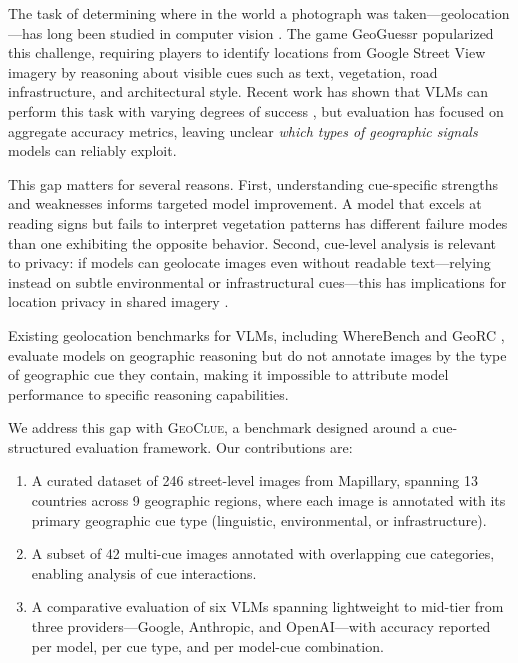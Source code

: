 \documentclass[twoside,11pt]{article}
\newcommand{\benchmark}{\textsc{GeoClue}}
\begin{document}
The task of determining where in the world a photograph was taken---geolocation---has long been studied in computer vision \citep{hays2008im2gps}. The game GeoGuessr popularized this challenge, requiring players to identify locations from Google Street View imagery by reasoning about visible cues such as text, vegetation, road infrastructure, and architectural style. Recent work has shown that VLMs can perform this task with varying degrees of success \citep{haas2024pigeon, jay2025precise}, but evaluation has focused on aggregate accuracy metrics, leaving unclear \emph{which types of geographic signals} models can reliably exploit.

This gap matters for several reasons. First, understanding cue-specific strengths and weaknesses informs targeted model improvement. A model that excels at reading signs but fails to interpret vegetation patterns has different failure modes than one exhibiting the opposite behavior. Second, cue-level analysis is relevant to privacy: if models can geolocate images even without readable text---relying instead on subtle environmental or infrastructural cues---this has implications for location privacy in shared imagery \citep{mendes2024gptgeochat}.

Existing geolocation benchmarks for VLMs, including WhereBench \citep{wherebench2025} and GeoRC \citep{talreja2026georc}, evaluate models on geographic reasoning but do not annotate images by the type of geographic cue they contain, making it impossible to attribute model performance to specific reasoning capabilities.

We address this gap with \benchmark{}, a benchmark designed around a cue-structured evaluation framework. Our contributions are:
\begin{enumerate}
    \item A curated dataset of 246 street-level images from Mapillary, spanning 13 countries across 9 geographic regions, where each image is annotated with its primary geographic cue type (linguistic, environmental, or infrastructure).
    \item A subset of 42 multi-cue images annotated with overlapping cue categories, enabling analysis of cue interactions.
    \item A comparative evaluation of six VLMs spanning lightweight to mid-tier from three providers---Google, Anthropic, and OpenAI---with accuracy reported per model, per cue type, and per model-cue combination.
\end{enumerate}
\end{document}

